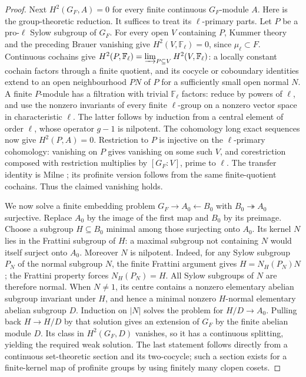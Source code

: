 \begin{proof}
Next $H^2(G_F,A)=0$ for every finite continuous $G_F$-module $A$.
Here is the group-theoretic reduction.  It suffices to treat its
$\ell$-primary parts.  Let $P$ be a pro-$\ell$ Sylow subgroup of $G_F$.
For every open $V$ containing $P$, Kummer theory and the preceding
Brauer vanishing give $H^2(V,\mathbb F_\ell)=0$, since $\mu_\ell\subset F$.
Continuous cochains give
$H^2(P,\mathbb F_\ell)=\varinjlim_{P\subseteq V}H^2(V,\mathbb F_\ell)$:
a locally constant cochain factors through a finite quotient, and its
cocycle or coboundary identities extend to an open neighbourhood $PN$ of
$P$ for a sufficiently small open normal $N$.  A finite $P$-module has a
filtration with trivial $\mathbb F_\ell$ factors: reduce by powers of
$\ell$, and use the nonzero invariants of every finite $\ell$-group on a
nonzero vector space in characteristic $\ell$.  The latter follows by
induction from a central element of order $\ell$, whose operator $g-1$
is nilpotent.  The cohomology long exact sequences now give
$H^2(P,A)=0$.  Restriction to $P$ is injective on the $\ell$-primary
cohomology: vanishing on $P$ gives vanishing on some such $V$, and
corestriction composed with restriction multiplies by $[G_F:V]$, prime
to $\ell$.  The transfer identity is Milne
\cite[II, Proposition 1.30]{D_MilneCFT}; its profinite version follows
from the same finite-quotient cochains.  Thus the claimed vanishing holds.

We now solve a finite embedding problem $G_F\to A_0\leftarrow B_0$
with $B_0\twoheadrightarrow A_0$ surjective.  Replace $A_0$ by the
image of the first map and $B_0$ by its preimage.  Choose a subgroup
$H\subseteq B_0$ minimal among those surjecting onto $A_0$.  Its kernel
$N$ lies in the Frattini subgroup of $H$: a maximal subgroup not
containing $N$ would itself surject onto $A_0$.  Moreover $N$ is
nilpotent.  Indeed, for any Sylow subgroup $P_N$ of the normal subgroup
$N$, the finite Frattini argument gives
$H=N_H(P_N)N$; the Frattini property forces $N_H(P_N)=H$.
All Sylow subgroups of $N$ are therefore normal.  When $N\ne1$, its
centre contains a nonzero elementary abelian subgroup invariant under
$H$, and hence a minimal nonzero $H$-normal elementary abelian subgroup
$D$.  Induction on $|N|$ solves the problem for $H/D\to A_0$.
Pulling back $H\to H/D$ by that solution gives an extension of $G_F$
by the finite abelian module $D$.  Its class in $H^2(G_F,D)$ vanishes,
so it has a continuous splitting, yielding the required weak solution.
The last statement follows directly from a continuous set-theoretic
section and its two-cocycle; such a section exists for a finite-kernel
map of profinite groups by using finitely many clopen cosets.


\end{proof}
